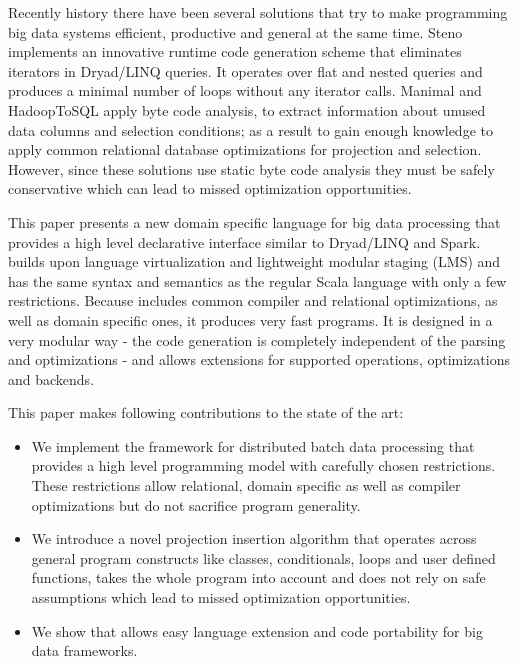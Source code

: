 Recently history there have been several solutions that try to make programming big data systems efficient, productive and general at the same time. Steno \cite{murray_steno:_2011} implements an innovative runtime code generation scheme that eliminates iterators in Dryad/LINQ queries. It operates over flat and nested queries and produces a minimal number of loops without any iterator calls. Manimal \cite{jahani_automatic_2011} and HadoopToSQL \cite{iu_hadooptosql:_2010} apply byte code analysis, to extract information about unused data columns and selection conditions; as a result to gain enough knowledge to apply common relational database optimizations for projection and selection. However, since these solutions use static byte code analysis they must be safely conservative which can lead to missed optimization opportunities.

This paper presents a new domain specific language \tool for big data processing that provides a high level declarative interface similar to Dryad/LINQ and Spark. \tool builds upon language virtualization \cite{moors_scala-virtualized_2012} and lightweight modular staging \cite{rompf_lightweight_2010} (LMS) and has the same syntax and semantics as the regular Scala language with only a few restrictions.
Because \tool includes common compiler and relational optimizations, as well as domain specific ones, it produces very fast programs. It is designed in a very modular way - the code generation is completely independent of the parsing and optimizations - and allows extensions for supported operations, optimizations and backends. 

This paper makes following contributions to the state of the art:    
\begin{itemize}

  \item We implement the \tool framework for distributed batch data
  processing that provides a high level programming model with carefully chosen
  restrictions. These restrictions allow relational, domain specific as well as
  compiler optimizations but do not sacrifice program generality.

  \item We introduce a novel projection insertion algorithm that operates across
  general program constructs like classes, conditionals, loops and user defined
  functions, takes the whole program into account and does not rely on safe
  assumptions which lead to missed optimization opportunities.

  \item We show that \tool allows easy language extension and code portability
  for big data frameworks.

\end{itemize} 

